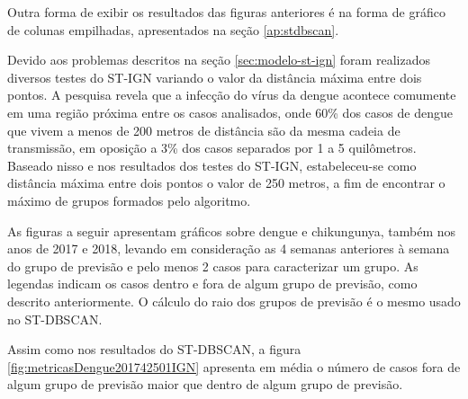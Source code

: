 Outra forma de exibir os resultados das figuras anteriores é na forma de gráfico de colunas empilhadas, apresentados na seção \ref{ap:stdbscan}.

Devido aos problemas descritos na seção \ref{sec:modelo-st-ign} foram realizados diversos testes do ST-IGN variando o valor da distância máxima entre dois pontos. A pesquisa \cite{Salje2017} revela que a infecção do vírus da dengue acontece comumente em uma região próxima entre os casos analisados, onde 60\% dos casos de dengue que vivem a menos de 200 metros de distância são da mesma cadeia de transmissão, em oposição a 3\% dos casos separados por 1 a 5 quilômetros. Baseado nisso e nos resultados dos testes do ST-IGN, estabeleceu-se como distância máxima entre dois pontos o valor de 250 metros, a fim de encontrar o máximo de grupos formados pelo algoritmo.

As figuras a seguir apresentam gráficos sobre dengue e chikungunya, também nos anos de 2017 e 2018, levando em consideração as 4 semanas anteriores à semana do grupo de previsão e pelo menos 2 casos para caracterizar um grupo. As legendas indicam os casos dentro e fora de algum grupo de previsão, como descrito anteriormente. O cálculo do raio dos grupos de previsão é o mesmo usado no \acrshort{ST-DBSCAN}.


Assim como nos resultados do \acrshort{ST-DBSCAN}, a figura \ref{fig:metricasDengue201742501IGN} apresenta em média o número de casos fora de algum grupo de previsão maior que dentro de algum grupo de previsão.

\begin{figure}[!ht]
	\centering	
\end{figure}
\FloatBarrier

